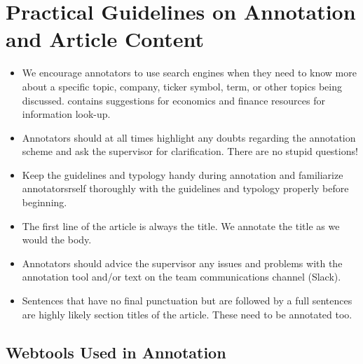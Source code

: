\section{Practical Guidelines on Annotation and Article Content}

\begin{itemize}[noitemsep, leftmargin=*]
    \item We encourage annotators to use search engines when they need to know more about a specific topic, company, ticker symbol, term, or other topics being discussed.  contains suggestions for economics and finance resources for information look-up.
    \item Annotators should at all times highlight any doubts regarding the annotation scheme and ask the supervisor for clarification. There are no stupid questions!
    \item Keep the guidelines and typology handy during annotation and familiarize annotatorsrself thoroughly with the guidelines and typology properly before beginning.
    \item The first line of the article is always the title. We annotate the title as we would the body.
    \item Annotators should advice the supervisor any issues and problems with the annotation tool and/or text on the team communications channel (Slack).
    \item Sentences that have no final punctuation but are followed by a full sentences are highly likely section titles of the article. These need to  be annotated too.
\end{itemize}

\subsection{Webtools Used in Annotation}

